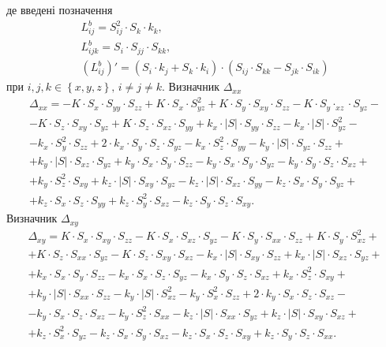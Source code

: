 де введені позначення
\begin{gather*}
  L_{ij}^b = S_{ij}^2 \cdot S_{k} \cdot k_k, \\
  L_{ijk}^b = S_i \cdot S_{jj} \cdot S_{kk}, \\
  \left( L_{ij}^b \right)' = \left(
  S_i \cdot k_j + S_k \cdot k_i \right) \cdot \left( S_{ij} \cdot S_{kk} -
  S_{jk} \cdot S_{ik} \right)
\end{gather*}
при $i, j, k \in \left\{ x, y, z \right\}, \, i \neq j \neq k$.
Визначник $ \Delta_{xx}$
\begin{gather*}
  \Delta_{xx} =
  -K \cdot S_x \cdot S_{yy} \cdot S_{zz} + K \cdot S_x \cdot S_{yz}^2 +
  K \cdot S_y \cdot S_{xy} \cdot S_{zz} - K \cdot S_y \cdot_{xz} \cdot S_{yz} - \\
  - K \cdot S_z \cdot S_{xy} \cdot S_{yz} + K \cdot S_{z} \cdot S_{xz} \cdot S_{yy} +
  k_x \cdot \left| S \right| \cdot S_{yy} \cdot S_{zz} -
  k_x \cdot \left| S \right| \cdot S_{yz}^2 - \\
  - k_x \cdot S_y^2 \cdot S_{zz} + 2 \cdot k_x \cdot S_y \cdot S_z \cdot S_{yz} -
  k_x \cdot S_z^2 \cdot S_{yy} - k_y \cdot \left| S \right| \cdot S_{yz} \cdot S_{zz} + \\
  + k_y \cdot \left| S \right| \cdot S_{xz} \cdot S_{yz} + k_y \cdot S_x \cdot S_y \cdot S_{zz} -
  k_y \cdot S_x \cdot S_y \cdot S_{yz} - k_y \cdot S_y \cdot S_z \cdot S_{xz} + \\
  + k_y \cdot S_z^2 \cdot S_{xy} + k_z \cdot \left| S \right| \cdot S_{xy} \cdot S_{yz} -
  k_z \cdot \left| S \right| \cdot S_{xz} \cdot S_{yy} - k_z \cdot S_x \cdot S_y \cdot S_{yz} + \\
  + k_z \cdot S_x \cdot S_z \cdot S_{yy} + k_z \cdot S_y^2 \cdot S_{xz} -
  k_z \cdot S_y \cdot S_z \cdot S_{xy}.
\end{gather*}
Визначник $ \Delta_{xy}$
\begin{gather*}
  \Delta_{xy} =
  K \cdot S_x \cdot S_{xy} \cdot S_{zz} - K \cdot S_x \cdot S_{xz} \cdot S_{yz} -
  K \cdot S_y \cdot S_{xx} \cdot S_{zz} + K \cdot S_y \cdot S_{xz}^2 + \\
  + K \cdot S_z \cdot S_{xx} \cdot S_{yz} - K \cdot S_z \cdot S_{xy} \cdot S_{xz} -
  k_x \cdot \left| S \right| \cdot S_{xy} \cdot S_{zz} +
  k_x \cdot \left| S \right| \cdot S_{xz} \cdot S_{yz} + \\
  + k_x \cdot S_x \cdot S_y \cdot S_{zz} - k_x \cdot S_x \cdot S_z \cdot S_{yz} -
  k_x \cdot S_y \cdot S_z \cdot S_{xz} + k_x \cdot S_z^2 \cdot S_{xy} + \\
  + k_y \cdot \left| S \right| \cdot S_{xx} \cdot S_{zz} -
  k_y \cdot \left| S \right| \cdot S_{xz}^2 - k_y \cdot S_x^2 \cdot S_{zz} +
  2 \cdot k_y \cdot S_x \cdot S_z \cdot S_{xz} - \\
  - k_y \cdot S_x \cdot S_z \cdot S_{xz} - k_y \cdot S_z^2 \cdot S_{xx} -
  k_z \cdot \left| S \right| \cdot S_{xx} \cdot S_{yz} +
  k_z \cdot \left| S \right| \cdot S_{xy} \cdot S_{xz} + \\
  + k_z \cdot S_x^2 \cdot S_{yz} - k_z \cdot S_x \cdot S_y \cdot S_{xz} -
  k_z \cdot S_x \cdot S_z \cdot S_{xy} + k_z \cdot S_y \cdot S_z \cdot S_{xx}.
\end{gather*}
